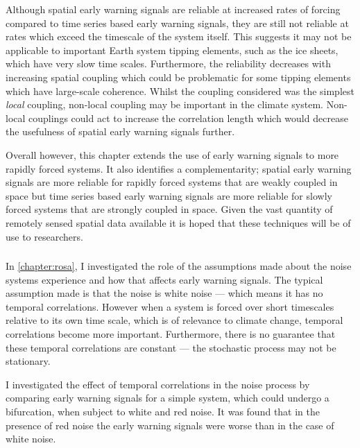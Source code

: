 Although spatial early warning signals are reliable at increased rates of forcing compared to time series based early warning signals, they are still not reliable at rates which exceed
the timescale of the system itself. This suggests it may not be applicable to important Earth system tipping elements, such as the ice sheets, which have very slow time scales. Furthermore, the reliability decreases with
increasing spatial coupling which could be problematic for some tipping elements which have large-scale coherence. Whilst the coupling considered was the simplest \emph{local} coupling, non-local
coupling may be important in the climate system. Non-local couplings could act to increase the correlation length which would decrease the usefulness of spatial early warning signals further.

Overall however, this chapter extends the use of early warning signals to more rapidly forced systems. It also identifies a complementarity; spatial early warning signals are more reliable
for rapidly forced systems that are weakly coupled in space but time series based early warning signals are more reliable for slowly forced systems that are strongly coupled in space.
Given the vast quantity of remotely sensed spatial data available \parencite{Campbell2011} it is hoped that these techniques will be of use to researchers.

\subsubsection{}

In \cref{chapter:rosa}, I investigated the role of the assumptions made about the noise systems experience and how that affects early warning signals.
The typical assumption made is that the noise is white noise --- which means it has no temporal correlations. However when a system is forced over short timescales relative
to its own time scale, which is of relevance to climate change, temporal correlations become more important. Furthermore, there is no guarantee that these temporal
correlations are constant --- the stochastic process may not be stationary.

I investigated the effect of temporal correlations in the noise process by comparing early warning signals for a simple system, which could undergo a bifurcation, when subject to
white and red noise. It was found that in the presence of red noise the early warning signals were worse than in the case of white noise.

